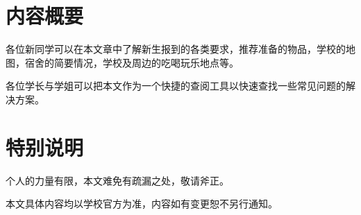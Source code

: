 \textbf{}

\section[内容概要]{内容概要}

各位新同学可以在本文章中了解新生报到的各类要求，推荐准备的物品，学校的地图，宿舍的简要情况，学校及周边的吃喝玩乐地点等。

各位学长与学姐可以把本文作为一个快捷的查阅工具以快速查找一些常见问题的解决方案。

\section[特别说明]{特别说明}
个人的力量有限，本文难免有疏漏之处，敬请斧正。

本文具体内容均以学校官方为准，内容如有变更恕不另行通知。